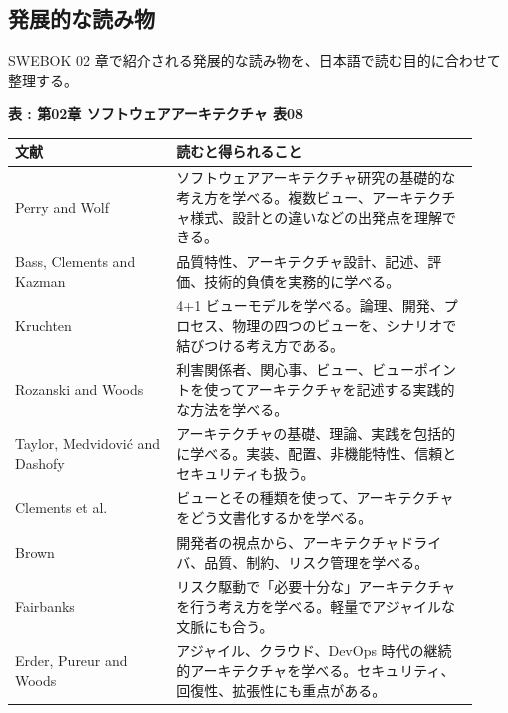 \subsection{発展的な読み物}
SWEBOK 02 章で紹介される発展的な読み物を、日本語で読む目的に合わせて整理する。

\par\smallskip\noindent{}\label{tab:ch02-08}\textbf{表 \thetable: 第02章 ソフトウェアアーキテクチャ 表08}\par\smallskip
\begin{longtable}{P{0.32\linewidth}P{0.60\linewidth}}
\toprule
文献 & 読むと得られること \\
\midrule
Perry and Wolf & ソフトウェアアーキテクチャ研究の基礎的な考え方を学べる。複数ビュー、アーキテクチャ様式、設計との違いなどの出発点を理解できる。 \\
Bass, Clements and Kazman & 品質特性、アーキテクチャ設計、記述、評価、技術的負債を実務的に学べる。 \\
Kruchten & 4+1 ビューモデルを学べる。論理、開発、プロセス、物理の四つのビューを、シナリオで結びつける考え方である。 \\
Rozanski and Woods & 利害関係者、関心事、ビュー、ビューポイントを使ってアーキテクチャを記述する実践的な方法を学べる。 \\
Taylor, Medvidović and Dashofy & アーキテクチャの基礎、理論、実践を包括的に学べる。実装、配置、非機能特性、信頼とセキュリティも扱う。 \\
Clements et al. & ビューとその種類を使って、アーキテクチャをどう文書化するかを学べる。 \\
Brown & 開発者の視点から、アーキテクチャドライバ、品質、制約、リスク管理を学べる。 \\
Fairbanks & リスク駆動で「必要十分な」アーキテクチャを行う考え方を学べる。軽量でアジャイルな文脈にも合う。 \\
Erder, Pureur and Woods & アジャイル、クラウド、DevOps 時代の継続的アーキテクチャを学べる。セキュリティ、回復性、拡張性にも重点がある。 \\
\bottomrule
\end{longtable}
